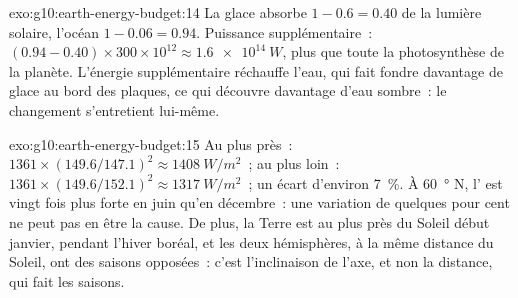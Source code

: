\begin{solution}{exo:g10:earth-energy-budget:14}
La glace absorbe $1 - 0.6 = 0.40$ de la lumière solaire, l'océan $1 - 0.06 =
0.94$. Puissance supplémentaire~: $(0.94 - 0.40) \times 300 \times 10^{12} \approx
\qty{1.6e14}{W}$, plus que toute la photosynthèse de la planète. L'énergie
supplémentaire réchauffe l'eau, qui fait fondre davantage de glace au bord
des plaques, ce qui découvre davantage d'eau sombre~: le changement
s'entretient lui-même.
\end{solution}

\begin{solution}{exo:g10:earth-energy-budget:15}
Au plus près~: $1361 \times (149.6/147.1)^2 \approx \qty{1408}{W/m^2}$~; au
plus loin~: $1361 \times (149.6/152.1)^2 \approx \qty{1317}{W/m^2}$~; un
écart d'environ \qty{7}{\percent}. À \qty{60}{\degree} N, l' est
vingt fois plus forte en juin qu'en décembre~: une variation de quelques
pour cent ne peut pas en être la cause. De plus, la Terre est au plus près
du Soleil début janvier, pendant l'hiver boréal, et les deux hémisphères, à
la même distance du Soleil, ont des saisons opposées~: c'est l'inclinaison
de l'axe, et non la distance, qui fait les saisons.
\end{solution}

